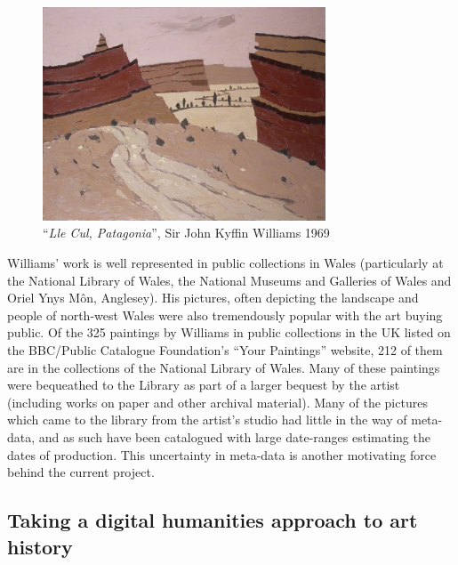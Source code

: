 \begin{figure}[h]
\centering
\includegraphics[width=0.75\textwidth]{img/lle-cul.jpg}
\caption[``\emph{Lle Cul, Patagonia}'']{``\emph{Lle Cul, Patagonia}'', Sir John Kyffin Williams 1969}
\label{fig:lle-cul}
\end{figure}

Williams' work is well represented in public collections in Wales
(particularly at the National Library of Wales, the National Museums and
Galleries of Wales and Oriel Ynys M\^{o}n, Anglesey). His pictures, often
depicting the landscape and people of north-west Wales were also tremendously
popular with the art buying public. Of the 325 paintings by Williams in public
collections in the UK listed on the BBC/Public Catalogue Foundation's ``Your
Paintings'' website, 212 of them are in the collections of the National Library
of Wales\cite{2013Your}. Many of these paintings were bequeathed to the Library
as part of a larger bequest by the artist (including works on paper and other
archival material). Many of the pictures which came to the library from the
artist's studio had little in the way of meta-data, and as such have been
catalogued with large date-ranges estimating the dates of production.  This
uncertainty in meta-data is another motivating force behind the current project.


\subsection{Taking a digital humanities approach to art history}


